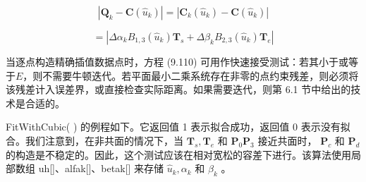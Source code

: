 \documentclass[../main.tex]{subfiles}
\begin{document}
\[
\left| {{\mathbf{Q}}_{k} - \mathbf{C}\left( {\widehat{u}}_{k}\right) }\right|  = \left| {{\mathbf{C}}_{k}\left( {\widehat{u}}_{k}\right)  - \mathbf{C}\left( {\widehat{u}}_{k}\right) }\right|
\]

\[
= \left| {\Delta {\alpha }_{k}{B}_{1,3}\left( {\widehat{u}}_{k}\right) {\mathbf{T}}_{s} + \Delta {\beta }_{k}{B}_{2,3}\left( {\widehat{u}}_{k}\right) {\mathbf{T}}_{e}}\right|  \tag{9.110}
\]

当逐点构造精确插值数据点时，方程 (9.110) 可用作快速接受测试：若其小于或等于\(E\)，则不需要牛顿迭代。若平面最小二乘系统存在非零的点约束残差，则必须将该残差计入误差界，或直接检查实际距离。如果需要迭代，则第 6.1 节中给出的技术是合适的。

FitWithCubic(   ) 的例程如下。它返回值 1 表示拟合成功，返回值 0 表示没有拟合。我们注意到，在非共面的情况下，当 \({\mathbf{T}}_{s},{\mathbf{T}}_{e}\) 和 \({\mathbf{P}}_{0}{\mathbf{P}}_{3}\) 接近共面时， \({\mathbf{P}}_{c}\) 和 \({\mathbf{P}}_{d}\) 的构造是不稳定的。因此，这个测试应该在相对宽松的容差下进行。该算法使用局部数组 uh[]、alfak[]、betak[] 来存储 \({\widehat{u}}_{k},{\alpha }_{k}\) 和 \({\beta }_{k}\) 。
\end{document}
